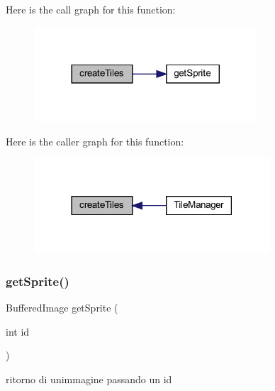 Here is the call graph for this function\+:\nopagebreak
\begin{figure}[H]
\begin{center}
\leavevmode
\includegraphics[width=236pt]{classmanagers_1_1_tile_manager_abb7fa074b36e6e355db16761115fb367_cgraph}
\end{center}
\end{figure}
Here is the caller graph for this function\+:\nopagebreak
\begin{figure}[H]
\begin{center}
\leavevmode
\includegraphics[width=249pt]{classmanagers_1_1_tile_manager_abb7fa074b36e6e355db16761115fb367_icgraph}
\end{center}
\end{figure}
\mbox{\label{classmanagers_1_1_tile_manager_a46ebd32c7ec4ac506010fe465687bdd7}} 
\subsubsection{\texorpdfstring{get\+Sprite()}{getSprite()}\hspace{0.1cm}{\footnotesize\ttfamily [1/2]}}
{\footnotesize\ttfamily Buffered\+Image get\+Sprite (\begin{DoxyParamCaption}\item[{int}]{id }\end{DoxyParamCaption})}



ritorno di un\textquotesingle{}immagine passando un id 


